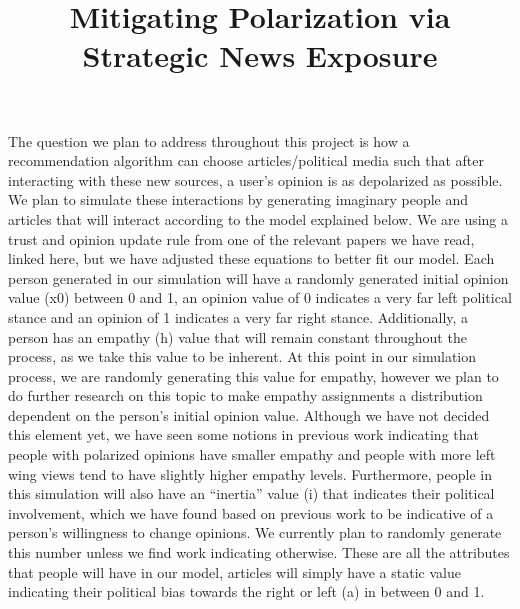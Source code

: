 \documentclass[11pt,reqno]{proc}
\begin{document}
\title{Mitigating Polarization via Strategic News Exposure} 

\maketitle
{} 

The question we plan to address throughout this project is how a recommendation algorithm can choose articles/political media such that after interacting with these new sources, a user’s opinion is as depolarized as possible. We plan to simulate these interactions by generating imaginary people and articles that will interact according to the model explained below. We are using a trust and opinion update rule from one of the relevant papers we have read, linked here, but we have adjusted these equations to better fit our model. Each person generated in our simulation will have a randomly generated initial opinion value (x0) between 0 and 1, an opinion value of 0 indicates a very far left political stance and an opinion of 1 indicates a very far right stance. Additionally, a person has an empathy (h) value that will remain constant throughout the process, as we take this value to be inherent. At this point in our simulation process, we are randomly generating this value for empathy, however we plan to do further research on this topic to make empathy assignments a distribution dependent on the person’s initial opinion value. Although we have not decided this element yet, we have seen some notions in previous work indicating that people with polarized opinions have smaller empathy and people with more left wing views tend to have slightly higher empathy levels. Furthermore, people in this simulation will also have an “inertia” value (i) that indicates their political involvement, which we have found based on previous work to be indicative of a person’s willingness to change opinions. We currently plan to randomly generate this number unless we find work indicating otherwise. These are all the attributes that people will have in our model, articles will simply have a static value indicating their political bias towards the right or left (a) in between 0 and 1.
\end{document}
